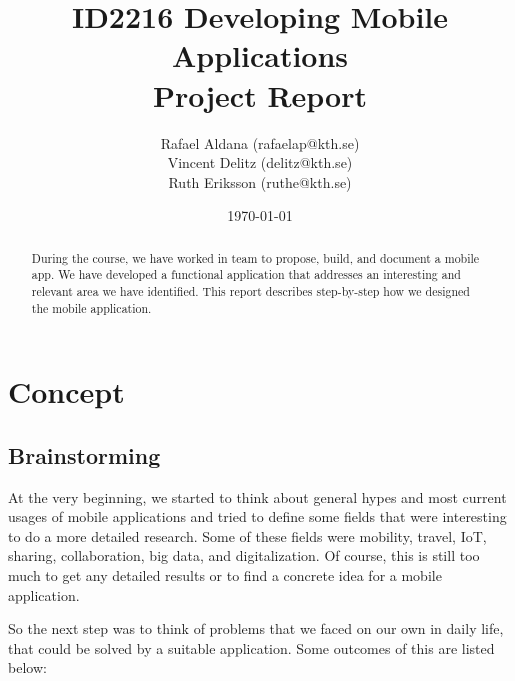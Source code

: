 \documentclass[11pt,twoside,a4paper]{report}
\begin{document}
\title{ID2216 Developing Mobile Applications\\Project Report}
\author{Rafael Aldana (rafaelap@kth.se)\\Vincent Delitz (delitz@kth.se)\\Ruth Eriksson (ruthe@kth.se)}
\date{\today}
\maketitle

\begin{abstract}
During the course, we have worked in team to propose, build, and document a mobile app. We have developed a functional application that addresses an interesting and relevant area we have identified. This report describes step-by-step how we designed the mobile application.
\end{abstract}

\tableofcontents

\renewcommand{\chaptername}{Section}
\setcounter{chapter}{0}
\chapter{Concept}

\section{Brainstorming}

At the very beginning, we started to think about general hypes and most current usages of mobile applications and tried to define some fields that were interesting to do a more detailed research. Some of these fields were mobility, travel, IoT, sharing, collaboration, big data, and digitalization. Of course, this is still too much to get any detailed results or to find a concrete idea for a mobile application.

So the next step was to think of problems that we faced on our own in daily life, that could be solved by a suitable application. Some outcomes of this are listed below:
\end{document}
